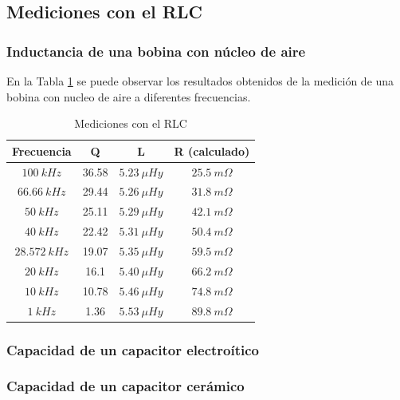 \documentclass[a4paper,10pt]{article}
\begin{document}
		\subsection{Mediciones con el RLC}		
		
		\subsubsection{Inductancia de una bobina con n\'ucleo de aire}
		En la Tabla \ref{tabRLCbobina} se puede observar los resultados obtenidos de la medici\'on de una bobina con nucleo de aire a diferentes frecuencias.
		\begin{table}[!htp]
					\centering
					\begin{tabular}{|c|c|c|c|}
						\hline
			    		Frecuencia & Q & L  & R (calculado) \\
						\hline
						$100~kHz$& 36.58 & $5.23~\mu Hy$ &$ 25.5~m\Omega$ \\
						\hline
						$66.66~kHz$& 29.44 & $5.26~\mu Hy$ &$ 31.8~m\Omega$ \\
						\hline
						$50~kHz$& 25.11 & $5.29~\mu Hy$ &$ 42.1~m\Omega$ \\
						\hline  
						$40~kHz$& 22.42 & $5.31~\mu Hy$ &$ 50.4~m\Omega$ \\
						\hline  										
						$28.572~kHz$& 19.07 & $5.35~\mu Hy$ &$ 59.5~m\Omega$ \\
						\hline
						$20~kHz$& 16.1 & $5.40~\mu Hy$ &$ 66.2~m\Omega$ \\
						\hline  
						$10~kHz$& 10.78 & $5.46~\mu Hy$ &$ 74.8~m\Omega$ \\
						\hline 										
						$1~kHz$& 1.36 & $5.53~\mu Hy$ &$ 89.8~m\Omega$ \\
						\hline 	  
					\end{tabular}
					\caption{Mediciones con el RLC} \label{tabRLCbobina}
				\end{table}
				
		\subsubsection{Capacidad de un capacitor electro\'itico}	
		\subsubsection{Capacidad de un capacitor cer\'amico}
		
\end{document}

